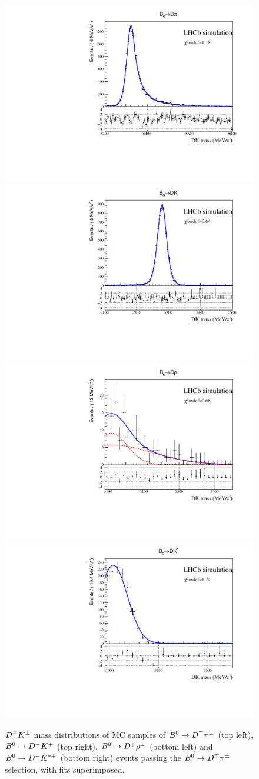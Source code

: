 \begin{figure}[t]
	\centering
	\includegraphics[width=0.45\linewidth]{03Massfit/figs/Template_combData_Signal_both_kpipi_2012_Bd2DKHypo_BeautyMass_binned.pdf}
	\includegraphics[width=0.45\linewidth]{03Massfit/figs/Template_combData_Bd2DK_both_2012_Bd2DKHypo_BeautyMass.pdf} \\
	\includegraphics[width=0.45\linewidth]{03Massfit/figs/Template_combData_Bd2DRho_both_2012_Bd2DKHypo_BeautyMass.pdf}
	\includegraphics[width=0.45\linewidth]{03Massfit/figs/Template_combData_Bd2DKst_both_2012_Bd2DKHypo_BeautyMass.pdf} \\
	\vspace{-2mm}
        \caption{$D^\mp K^\pm$ mass distributions of MC samples of $B^0\rightarrow D^\mp\pi^\pm$ (top left), $B^0\rightarrow D^-K^+$ (top right),
          $B^0\rightarrow D^\mp\rho^\pm$ (bottom left) and $B^0\rightarrow D^{-}K^{*+}$ (bottom right) events passing the $B^0\rightarrow D^\mp\pi^\pm$
          selection, with fits superimposed.}
	\label{fig:MCKsample}
\end{figure}

